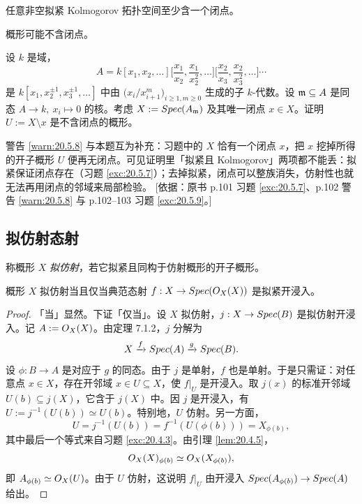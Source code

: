 \begin{exercise}\label{exc:20.5.7}
任意非空拟紧 Kolmogorov 拓扑空间至少含一个闭点。
\end{exercise}

\begin{warning}\label{warn:20.5.8}
概形可能不含闭点。
\end{warning}

\begin{exercise}\label{exc:20.5.9}
设 $k$ 是域，
\[
A=k[x_1,x_2,\dots]\Big[\frac{x_1}{x_2},\frac{x_1}{x_2^2},\dots\Big]\Big[\frac{x_2}{x_3},\frac{x_2}{x_3^2},\dots\Big]\cdots
\]
是 $k[x_1,x_2^{\pm1},x_3^{\pm1},\dots]$ 中由 $\big(x_i/x_{i+1}^m\big)_{i\ge1,m\ge0}$ 生成的子 $k$-代数。设 $\mathfrak{m}\subseteq A$ 是同态 $A\to k,\ x_i\mapsto0$ 的核。考虑 $X:=Spec(A_{\mathfrak{m}})$ 及其唯一闭点 $x\in X$。证明 $U:=X\setminus x$ 是不含闭点的概形。
\end{exercise}

\begin{yizhu}
警告 \ref{warn:20.5.8} 与本题互为补充：习题中的 $X$ 恰有一个闭点 $x$，把 $x$ 挖掉所得的开子概形 $U$ 便再无闭点。可见证明里「拟紧且 Kolmogorov」两项都不能丢：拟紧保证闭点存在（习题 \ref{exc:20.5.7}）；去掉拟紧，闭点可以整族消失，仿射性也就无法再用闭点的邻域来局部检验。
[依据：原书 p.101 习题 \ref{exc:20.5.7}、p.102 警告 \ref{warn:20.5.8} 与 p.102–103 习题 \ref{exc:20.5.9}。]
\end{yizhu}

\subsection{拟仿射态射}\label{sec:20.6}

\begin{definition}\label{def:20.6.1}
称概形 $X$ \emph{拟仿射}，若它拟紧且同构于仿射概形的开子概形。
\end{definition}

\begin{proposition}\label{prop:20.6.2}
概形 $X$ 拟仿射当且仅当典范态射 $f:X\to Spec(O_X(X))$ 是拟紧开浸入。
\end{proposition}

\begin{proof}
「当」显然。下证「仅当」。设 $X$ 拟仿射，$j:X\to Spec(B)$ 是拟仿射开浸入。记 $A:=O_X(X)$。由定理 7.1.2，$j$ 分解为
\[
X\xrightarrow{f}Spec(A)\xrightarrow{g}Spec(B).
\]
设 $\phi:B\to A$ 是对应于 $g$ 的同态。由于 $j$ 是单射，$f$ 也是单射。于是只需证：对任意点 $x\in X$，存在开邻域 $x\in U\subseteq X$，使 $f|_U$ 是开浸入。取 $j(x)$ 的标准开邻域 $U(b)\subseteq j(X)$，它含于 $j(X)$ 中。因 $j$ 是开浸入，有 $U:=j^{-1}(U(b))\simeq U(b)$。特别地，$U$ 仿射。另一方面，
\[
U=j^{-1}(U(b))=f^{-1}(U(\phi(b)))=X_{\phi(b)},
\]
其中最后一个等式来自习题 \ref{exc:20.4.3}。由引理 \ref{lem:20.4.5}，
\[
O_X(X)_{\phi(b)}\simeq O_X(X_{\phi(b)}),
\]
即 $A_{\phi(b)}\simeq O_X(U)$。由于 $U$ 仿射，这说明 $f|_U$ 由开浸入 $Spec(A_{\phi(b)})\to Spec(A)$ 给出。
\end{proof}

